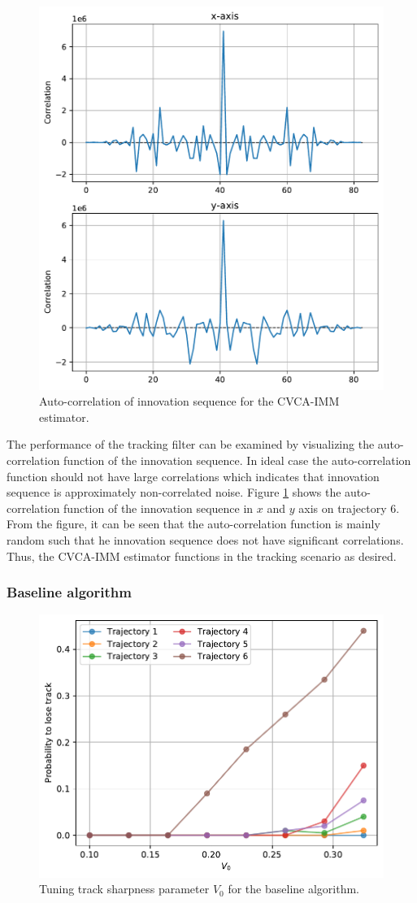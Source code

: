 \documentclass[english, 12pt, a4paper, elec, utf8, a-1b, online]{aaltothesis}
\begin{document}
\begin{figure}[bt]
    \centering
    \includegraphics[width=0.7\linewidth]{figures/benchmark/IMM/correlation_imm.pdf}
    \caption{Auto-correlation of innovation sequence for the CVCA-IMM estimator.}
    \label{fig:auto_correlation}
\end{figure}

The performance of the tracking filter can be examined by visualizing the auto-correlation function of the innovation sequence.
In ideal case the auto-correlation function should not have large correlations which indicates that innovation sequence is approximately non-correlated noise.
Figure \ref{fig:auto_correlation} shows the auto-correlation function of the innovation sequence in $x$ and $y$ axis on trajectory 6.
From the figure, it can be seen that the auto-correlation function is mainly random such that he innovation sequence does not have significant correlations.
Thus, the CVCA-IMM estimator functions in the tracking scenario as desired.



\subsubsection{Baseline algorithm}

\begin{figure}[tb]
    \centering
    \includegraphics[width=0.7\linewidth]{figures/benchmark/Simulations/plt_baseline.pdf}
    \caption{Tuning track sharpness parameter $V_0$ for the baseline algorithm.}
    \label{fig:baseline_plt}
\end{figure}
\end{document}
